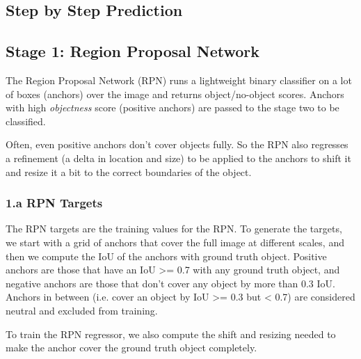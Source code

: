 \documentclass[11pt]{article}
\begin{document}
    \subsection{Step by Step Prediction}\label{step-by-step-prediction}

    \subsection{Stage 1: Region Proposal
Network}\label{stage-1-region-proposal-network}

The Region Proposal Network (RPN) runs a lightweight binary classifier
on a lot of boxes (anchors) over the image and returns object/no-object
scores. Anchors with high \emph{objectness} score (positive anchors) are
passed to the stage two to be classified.

Often, even positive anchors don't cover objects fully. So the RPN also
regresses a refinement (a delta in location and size) to be applied to
the anchors to shift it and resize it a bit to the correct boundaries of
the object.

    \subsubsection{1.a RPN Targets}\label{a-rpn-targets}

The RPN targets are the training values for the RPN. To generate the
targets, we start with a grid of anchors that cover the full image at
different scales, and then we compute the IoU of the anchors with ground
truth object. Positive anchors are those that have an IoU
\textgreater{}= 0.7 with any ground truth object, and negative anchors
are those that don't cover any object by more than 0.3 IoU. Anchors in
between (i.e. cover an object by IoU \textgreater{}= 0.3 but \textless{}
0.7) are considered neutral and excluded from training.

To train the RPN regressor, we also compute the shift and resizing
needed to make the anchor cover the ground truth object completely.
\end{document}
